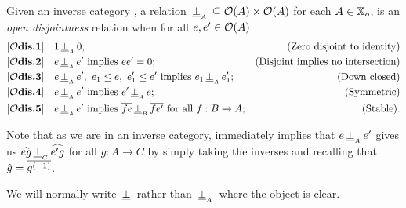 \begin{definition}\label{def:disjointness_in_open_x}
  Given an inverse category \X, a relation $\,\underline{\perp}_{{}_{A}}\, \subseteq \mathcal{O}({A})\times\mathcal{O}({A})$ for
  each $A \in {\ensuremath{\mathbb{X}}}_o$, is an \emph{open disjointness} relation when for all $e, e' \in
  \mathcal{O}({A})$
  \begin{align*}
    \axiom{$\mathcal{O}$dis}{1}\quad &1 \ocdperpsub{A} 0; &\text{(Zero disjoint to identity)}\\
    \axiom{$\mathcal{O}$dis}{2}\quad &e \ocdperpsub{A} e' \text{ implies }e e' = 0; &\text{(Disjoint implies no intersection)}\\
    \axiom{$\mathcal{O}$dis}{3}\quad &e \ocdperpsub{A} e',\ e_1 \le e,\ e_1' \le e'
      \text{ implies }e_1 \ocdperpsub{A} e_1'; &\text{(Down closed)}\\
    \axiom{$\mathcal{O}$dis}{4}\quad &e \ocdperpsub{A} e' \text{ implies }e' \ocdperpsub{A} e;
    &\text{(Symmetric)}\\
    \axiom{$\mathcal{O}$dis}{5}\quad &e \ocdperpsub{A} e' \text{ implies }\rst{f e} \ocdperpsub{B}
      \rst{f e'}\text{ for all }f:B \to A; &\text{(Stable)}.\\
  \end{align*}
\end{definition}

Note that as we are in an inverse category,  immediately implies that $e
\,\underline{\perp}_{{}_{A}}\, e'$ gives us $\widehat{e g} \,\underline{\perp}_{{}_{C}}\,  \widehat{e' g}$ for all $g:A \to C$ by simply
taking the inverses and recalling that $\hat{g} = \overline{{g}^{(-1)}}$.

We will normally write $\,\underline{\perp}\,$ rather than $\,\underline{\perp}_{{}_{A}}\,$ where the object is clear.

